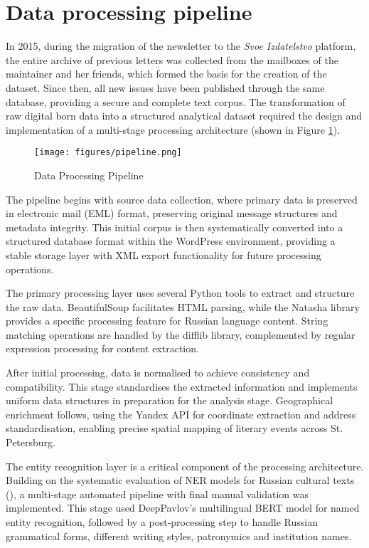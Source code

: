 \documentclass{jcls}
\begin{document}
\section{Data processing pipeline}

In 2015, during the migration of the newsletter to the \textit{Svoe Izdatelstvo} platform, the entire archive of previous letters was collected from the mailboxes of the maintainer and her friends, which formed the basis for the creation of the dataset. Since then, all new issues have been published through the same database, providing a secure and complete text corpus. The transformation of raw digital born data into a structured analytical dataset required the design and implementation of a multi-stage processing architecture (shown in Figure \ref{pipeline}).

\begin{figure}
	\texttt{[image: figures/pipeline.png]}
	\caption{Data Processing Pipeline}
    \label{pipeline}
\end{figure}

The pipeline begins with source data collection, where primary data is preserved in electronic mail (EML) format, preserving original message structures and metadata integrity. This initial corpus is then systematically converted into a structured database format within the WordPress environment, providing a stable storage layer with XML export functionality for future processing operations.

The primary processing layer uses several Python tools to extract and structure the raw data. BeautifulSoup facilitates HTML parsing, while the Natasha library provides a specific processing feature for Russian language content. String matching operations are handled by the difflib library, complemented by regular expression processing for content extraction. 

After initial processing, data is normalised to achieve consistency and compatibility. This stage standardises the extracted information and implements uniform data structures in preparation for the analysis stage. Geographical enrichment follows, using the Yandex API for coordinate extraction and address standardisation, enabling precise spatial mapping of literary events across St. Petersburg.

The entity recognition layer is a critical component of the processing architecture. Building on the systematic evaluation of NER models for Russian cultural texts (\cite{lev2024ner}), a multi-stage automated pipeline with final manual validation was implemented. This stage used DeepPavlov's multilingual BERT model for named entity recognition, followed by a post-processing step to handle Russian grammatical forms, different writing styles, patronymics and institution names.
\end{document}
